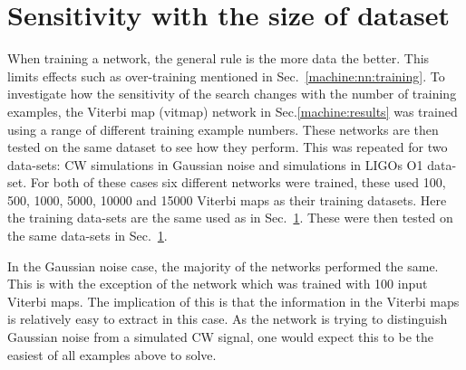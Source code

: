 \section{\label{machine:cnn:sens_size} Sensitivity with the size of dataset}

When training a network, the general rule is the more data the better. 
This limits effects such as over-training mentioned in Sec.~\ref{machine:nn:training}.
To investigate how the sensitivity of the search changes with the number of training examples, the Viterbi map (vitmap) network in Sec.\ref{machine:results} was trained using a range of different training example numbers. 
These networks are then tested on the same dataset to see how they perform.
This was repeated for two data-sets: \ac{CW} simulations in Gaussian noise and simulations in \acp{LIGO} O1 data-set. 
For both of these cases six different networks were trained, these used 100, 500, 1000, 5000, 10000 and 15000 Viterbi maps as their training datasets.
Here the training data-sets are the same used as in Sec.~\ref{}.
These were then tested on the same data-sets in Sec.~\ref{}.

In the Gaussian noise case, the majority of the networks performed the same. 
This is with the exception of the network which was trained with 100 input Viterbi maps. 
The implication of this is that the information in the Viterbi maps is relatively easy to extract in this case. 
As the network is trying to distinguish Gaussian noise from a simulated \ac{CW} signal, one would expect this to be the easiest of all examples above to solve. 

